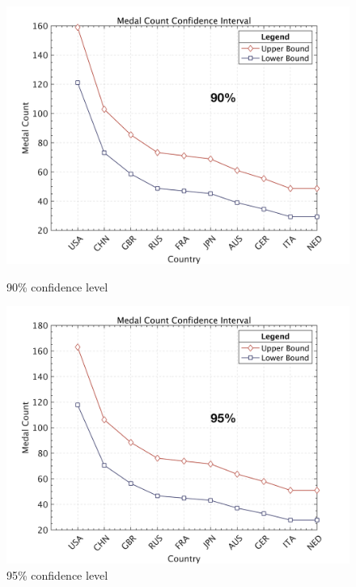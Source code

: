 \documentclass{mcmthesis}  %
\begin{document}
\begin{figure}[H]
\begin{minipage}{0.45\textwidth}
        \includegraphics[width=\linewidth]{5个置信区间/90.png}
        \caption{90\% confidence level}
    \end{minipage}
    \begin{minipage}{0.45\textwidth}
        \centering
        \includegraphics[width=\linewidth]{5个置信区间/95.png}
        \caption{95\% confidence level}
    \end{minipage}
    \begin{minipage}{0.45\textwidth}
        \centering

\end{minipage}
\end{figure}
\end{document}
